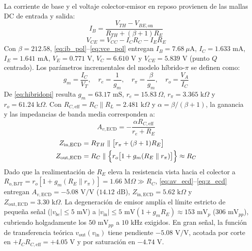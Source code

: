 \documentclass[conference]{IEEEtran}
\begin{document}
La corriente de base y el voltaje colector-emisor en reposo provienen de las mallas DC de entrada y salida:
\begin{equation}
I_B = \frac{V_{TH} - V_{BE,\mathrm{on}}}{R_{TH} + (\beta + 1)R_E}
\label{eq:ib_pol}
\end{equation}
\begin{equation}
V_{CE} = V_{CC} - I_C R_C - I_E R_E
\label{eq:vce_pol}
\end{equation}
Con $\beta = 212.58$, \eqref{eq:ib_pol}--\eqref{eq:vce_pol} entregan $I_B = 7.68\ \mu\text{A}$, $I_C = 1.633\text{ mA}$, $I_E = 1.641\text{ mA}$, $V_E = 0.771\text{ V}$, $V_C = 6.610\text{ V}$ y $V_{CE} = 5.839\text{ V}$ (punto $Q$ centrado). Los par\'ametros incrementales del modelo h\'ibrido-$\pi$ \cite{sedra2020} se definen como:
\begin{equation}
g_m = \frac{I_C}{V_T}, \quad r_e = \frac{1}{g_m}, \quad r_\pi = \frac{\beta}{g_m}, \quad r_o = \frac{V_A}{I_C}
\label{eq:hibridopi}
\end{equation}
De \eqref{eq:hibridopi} resulta $g_m = 63.17\text{ mS}$, $r_e = 15.83\ \Omega$, $r_\pi = 3.365\text{ k}\Omega$ y $r_o = 61.24\text{ k}\Omega$. Con $R_{C,\mathrm{eff}} = R_C \parallel R_L = 2.481\text{ k}\Omega$ y $\alpha = \beta/(\beta+1)$, la ganancia y las impedancias de banda media corresponden a:
\begin{equation}
A_{v,\mathrm{ECD}} = -\frac{\alpha R_{C,\mathrm{eff}}}{r_e + R_E}
\label{eq:av_ecd}
\end{equation}
\begin{equation}
\begin{aligned}
Z_{\mathrm{in,ECD}} &= R_{TH} \parallel \bigl[r_\pi + (\beta + 1)R_E\bigr] \\
Z_{\mathrm{out,ECD}} &= R_C \parallel \Bigl\{r_o\bigl[1 + g_m(R_E \parallel r_\pi)\bigr]\Bigr\} \approx R_C
\end{aligned}
\label{eq:z_ecd}
\end{equation}
Dado que la realimentaci\'on de $R_E$ eleva la resistencia vista hacia el colector a $R_{o,\mathrm{BJT}} = r_o[1 + g_m(R_E \parallel r_\pi)] = 1.66\text{ M}\Omega \gg R_C$, \eqref{eq:av_ecd}--\eqref{eq:z_ecd} entregan $A_{v,\mathrm{ECD}} = -5.08\text{ V/V}$ ($14.12\text{ dB}$), $Z_{\mathrm{in,ECD}} = 5.62\text{ k}\Omega$ y $Z_{\mathrm{out,ECD}} = 3.30\text{ k}\Omega$. La degeneraci\'on de emisor ampl\'ia el l\'imite estricto de peque\~na se\~nal ($|v_{be}| \le 5\text{ mV}$) a $|v_{\mathrm{in}}| \le 5\text{ mV}(1 + g_m R_E) \approx 153\text{ mV}_p$ ($306\text{ mV}_{pp}$), cubriendo holgadamente los $50\text{ mV}_{pp}$ a $10\text{ kHz}$ exigidos. En gran se\~nal, la funci\'on de transferencia te\'orica $v_{\mathrm{out}}(v_{\mathrm{in}})$ tiene pendiente $-5.08\text{ V/V}$, acotada por corte en $+I_C R_{C,\mathrm{eff}} = +4.05\text{ V}$ y por saturaci\'on en $-4.74\text{ V}$.
\end{document}

